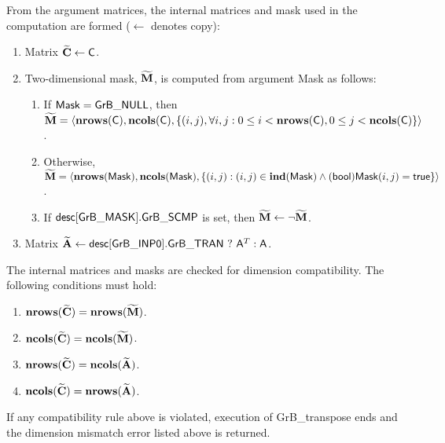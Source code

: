 From the argument matrices, the internal matrices and mask used in 
the computation are formed ($\leftarrow$ denotes copy):
\begin{enumerate}
	\item Matrix ${\bf \widetilde{C}} \leftarrow {\sf C}$.

	\item Two-dimensional mask, ${\bf \widetilde{M}}$, is computed from
    argument {\sf Mask} as follows:
	\begin{enumerate}
		\item	If ${\sf Mask} = {\sf GrB\_NULL}$, then ${\bf \widetilde{M}} = 
        \langle \bold{nrows}({\sf C}), \bold{ncols}({\sf C}), \{(i,j), 
        \forall i,j : 0 \leq i <  \bold{nrows}({\sf C}), 0 \leq j < 
        \bold{ncols}({\sf C}) \} \rangle$.

		\item	Otherwise, ${\bf \widetilde{M}} = \langle \bold{nrows}({\sf Mask}), 
        \bold{ncols}({\sf Mask}), \{(i,j) : (i,j) \in \bold{ind}({\sf Mask}) \wedge 
        ({\sf bool}){\sf Mask}(i,j) = {\sf true}\} \rangle$.

		\item	If ${\sf desc[GrB\_MASK].GrB\_SCMP}$ is set, then 
        ${\bf \widetilde{M}} \leftarrow \neg {\bf \widetilde{M}}$.
	\end{enumerate}

	\item Matrix ${\bf \widetilde{A}} \leftarrow
    {\sf desc[GrB\_INP0].GrB\_TRAN} \ ? \ {\sf A}^T : {\sf A}$.
\end{enumerate}

The internal matrices and masks are checked for dimension compatibility. The following
conditions must hold:
\begin{enumerate}
	\item $\bold{nrows}({\bf \widetilde{C}}) = \bold{nrows}({\bf \widetilde{M}})$.

	\item $\bold{ncols}({\bf \widetilde{C}}) = \bold{ncols}({\bf \widetilde{M}})$.

	\item $\bold{nrows}({\bf \widetilde{C}}) = \bold{ncols}({\bf \widetilde{A}})$.

	\item $\bold{ncols}({\bf \widetilde{C}}) = \bold{nrows}({\bf \widetilde{A}})$.
\end{enumerate}
If any compatibility rule above is violated, execution of {\sf GrB\_transpose} ends and
the dimension mismatch error listed above is returned.

